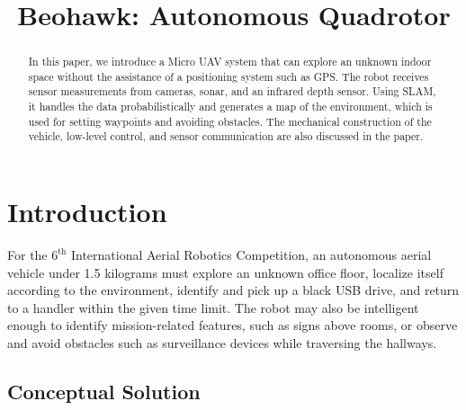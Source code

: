 \documentclass[12pt, letterpaper]{article}
\title{Beohawk: Autonomous Quadrotor}
\begin{document}
\maketitle
\begin{people}

\end{people}

\begin{abstract}
In this paper, we introduce a Micro UAV system that can explore an unknown indoor space without the assistance of a positioning system such as GPS. The robot receives sensor measurements from cameras, sonar, and an infrared depth sensor.  Using SLAM, it handles the data probabilistically and generates a map of the environment, which is used for setting waypoints and avoiding obstacles.  The mechanical construction of the vehicle, low-level control, and sensor communication are also discussed in the paper.
\end{abstract}

\section{Introduction}


For the $6^\text{th}$ International Aerial Robotics Competition, an autonomous aerial vehicle under 1.5 kilograms must explore an unknown office floor, localize itself according to the environment, identify and pick up a black USB drive, and return to a handler within the given time limit. The robot may also be intelligent enough to identify mission-related features, such as signs above rooms, or observe and avoid obstacles such as surveillance devices while traversing the hallways.

\subsection{Conceptual Solution}
\end{document}
